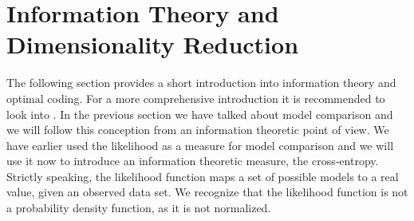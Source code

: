 \section{Information Theory and Dimensionality Reduction}
The following section provides a short introduction into information theory and optimal coding.
For a more comprehensive introduction it is recommended to look into 
\cite[Chapter 6 \& 7]{Applebaum2008}. In the previous section we have talked about
model comparison and we will follow this conception from an information theoretic
point of view.
We have earlier used the likelihood as a measure for model comparison and we will use it now
to introduce an information theoretic measure, the cross-entropy. Strictly speaking, the
likelihood function maps a set of possible models to a real value, given an observed data
set. We recognize that the likelihood function is not a probability density function, as it is
not normalized.

